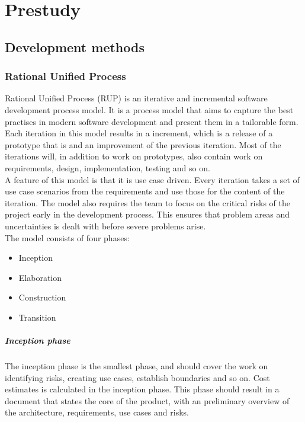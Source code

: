 \chapter{Prestudy}
\section{Development methods}

\subsection{Rational Unified Process}
Rational Unified Process (RUP) is an iterative and incremental software development process model. It is a process model that aims to capture the best practises in modern software development and present them in a tailorable form.\cite{kruchten} Each iteration in this model results in a increment, which is a release of a prototype that is and an improvement of the previous iteration. Most of the iterations will, in addition to work on prototypes, also contain work on requirements, design, implementation, testing and so on.\\
\newline
A feature of this model is that it is use case driven. Every iteration takes a set of use case scenarios from the requirements and use those for the content of the iteration. The model also requires the team to focus on the critical risks of the project early in the development process. This ensures that problem areas and uncertainties is dealt with before severe problems arise.\\
\newline
The model consists of four phases:

\begin{itemize}
\item{Inception}
\item{Elaboration}
\item{Construction}
\item{Transition}
\end{itemize}

\paragraph{Inception phase} The inception phase is the smallest phase, and should cover the work on identifying risks, creating use cases, establish boundaries and so on. Cost estimates is calculated in the inception phase. This phase should result in a document that states the core of the product, with an preliminary overview of the architecture, requirements, use cases and risks.


